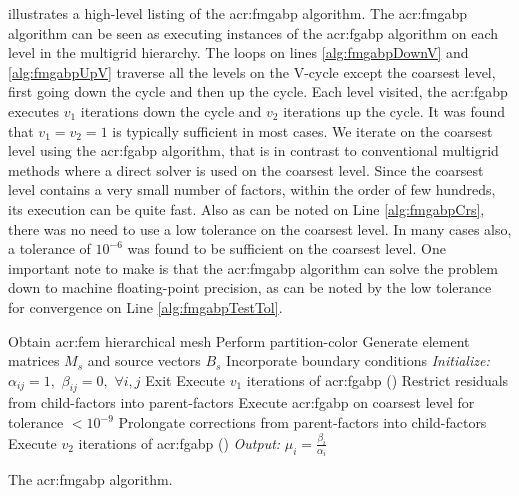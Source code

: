  illustrates a high-level listing of the \gls{acr:fmgabp} algorithm.
The \gls{acr:fmgabp} algorithm can be seen as executing instances of the \gls{acr:fgabp} algorithm on each level in the multigrid hierarchy.
The loops on lines \ref{alg:fmgabpDownV} and \ref{alg:fmgabpUpV} traverse all the levels on the V-cycle except the coarsest level, first going down the cycle and then up the cycle.
Each level visited, the \gls{acr:fgabp} executes $v_1$ iterations down the cycle and $v_2$ iterations up the cycle.
It was found that $v_1 = v_2 =1$ is typically sufficient in most cases.
We iterate on the coarsest level using the \gls{acr:fgabp} algorithm, that is in contrast to conventional multigrid methods where a direct solver is used on the coarsest level.
Since the coarsest level contains a very small number of factors, within the order of few hundreds, its execution can be quite fast.
Also as can be noted on Line \ref{alg:fmgabpCrs}, there was no need to use a low tolerance on the coarsest level.
In many cases also, a tolerance of $10^{-6}$ was found to be sufficient on the coarsest level.
One important note to make is that the \gls{acr:fmgabp} algorithm can solve the problem down to machine floating-point precision, as can be noted by the low tolerance for convergence on Line \ref{alg:fmgabpTestTol}.

\begin{algorithm}[t]
	\begin{algorithmic}[1]
		\STATE Obtain \gls{acr:fem} hierarchical mesh
		\STATE Perform partition-color
		\STATE Generate element matrices $M_s$ and source vectors $B_s$ 
		\STATE Incorporate boundary conditions 
		\STATE \textit{Initialize:} $\alpha_{ij} = 1,\,\, \beta_{ij} = 0,\,\,\forall i,j$
		\AlgENDLOOP
		\REPEAT[\gls{acr:fmgabp} V-cycle iteration: $t=1,2,\cdots$]
		 \label{alg:fmgabpDownV}
		\STATE Exit
	\ENDIF
	\STATE Execute $v_1$ iterations of \gls{acr:fgabp} ()
	\STATE Restrict residuals from child-factors into parent-factors
	\AlgENDLOOP
	\STATE Execute \gls{acr:fgabp} on coarsest level for tolerance  $<10^{-9}$ \label{alg:fmgabpCrs}
	 \label{alg:fmgabpUpV}
	\STATE Prolongate corrections from parent-factors into child-factors
	\STATE Execute $v_2$ iterations of \gls{acr:fgabp} ()
	\AlgENDLOOP
	 \label{alg:fmgabpTestTol}
	\STATE \textit{Output:} $\mu_i = \frac{\beta_i}{\alpha_i}$
\end{algorithmic}
\caption{The \acrshort{acr:fmgabp} algorithm.}
\label{alg:fmgabp}
\end{algorithm}

